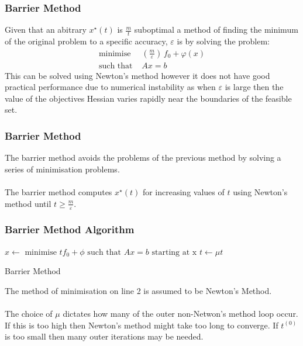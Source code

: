 \documentclass{beamer}
\begin{document}
\begin{frame}
    \frametitle{Barrier Method}
    Given that an abitrary $x^{\star}(t)$ is $\frac{m}{t}$ suboptimal a method of
    finding the minimum of the original problem to a specific accuracy,
    $\varepsilon$ is by solving the problem:
    \begin{align*}
        \text{minimise } \, &\left(\frac{m}{\varepsilon}\right)\,f_{0} +
        \varphi(x)\\
        \text{such that } & Ax =b
    \end{align*}
    This can be solved using Newton's method however it does not have good
    practical performance due to numerical instability as when  $\varepsilon$
    is large then the value of the objectives Hessian varies rapidly near the
    boundaries of the feasible set.
\end{frame}

\begin{frame}
    \frametitle{Barrier Method}
    The barrier method avoids the problems of the previous method by solving a
    series of minimisation problems.
    \\~\\
    The barrier method computes $x^{\star}(t)$ for increasing values of
    $t$ using Newton's method until $t \geq \frac{m}{\varepsilon}$.
\end{frame}


\begin{frame}
    \frametitle{Barrier Method Algorithm}
    \begin{algorithm}[H]
        \begin{algorithmic}[1]
            \STATE $x \leftarrow \text{ minimise } tf_{0} + \phi
            \text{ such that } Ax = b \text{ starting at x}$
            \STATE $t \leftarrow \mu t$
            \ENDWHILE
        \end{algorithmic}
        \caption{Barrier Method}
        \label{alg:seq}
    \end{algorithm}
    The method of minimisation on line 2 is assumed to be Newton's Method.
    \\~\\
    The choice of $\mu$ dictates how many of the outer non-Netwon's method loop
    occur. If this is too high then Newton's method might take too long to
    converge. If $t^{(0)}$ is too small then many outer iterations may be
    needed.
\end{frame}
\end{document}
